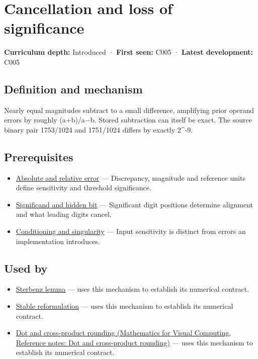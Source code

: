 \hypertarget{appendix-a2773a6a2f9d}{}\label{referencestart:appendix-a2773a6a2f9d}
\section{Cancellation and loss of significance}\label{appendix-a2773a6a2f9d-cancellation-and-loss-of-significance}

\textbf{Curriculum depth:} Introduced · \textbf{First seen:} C005 · \textbf{Latest development:} C005

\subsection{Definition and mechanism}\label{appendix-a2773a6a2f9d-definition-and-mechanism}

Nearly equal magnitudes subtract to a small difference, amplifying prior operand errors by roughly (\textbar a\textbar+\textbar b\textbar)/\textbar a−b\textbar. Stored subtraction can itself be exact. The source binary pair 1753/1024 and 1751/1024 differs by exactly 2\^{}-9.

\subsection{Prerequisites}\label{appendix-a2773a6a2f9d-prerequisites}

\begin{itemize}
\tightlist
\item
  \hyperref[appendix-3ae74e89b4e6]{Absolute and relative error} --- Discrepancy, magnitude and reference units define sensitivity and threshold significance.
\item
  \hyperref[appendix-a24fd710cf67]{Significand and hidden bit} --- Significant digit positions determine alignment and what leading digits cancel.
\item
  \hyperref[appendix-8f6a01f284a7]{Conditioning and singularity} --- Input sensitivity is distinct from errors an implementation introduces.
\end{itemize}

\subsection{Used by}\label{appendix-a2773a6a2f9d-used-by}

\begin{itemize}
\tightlist
\item
  \hyperref[appendix-399b7ad53f39]{Sterbenz lemma} --- uses this mechanism to establish its numerical contract.
\item
  \hyperref[appendix-d7f8ba961670]{Stable reformulation} --- uses this mechanism to establish its numerical contract.
\item
  \href{../02-Mathematics-for-Visual-Computing/main.pdf\#nameddest=appendix-5aef4f13483a}{Dot and cross-product rounding (Mathematics for Visual Computing, Reference notes: Dot and cross-product rounding)} --- uses this mechanism to establish its numerical contract.
\end{itemize}

